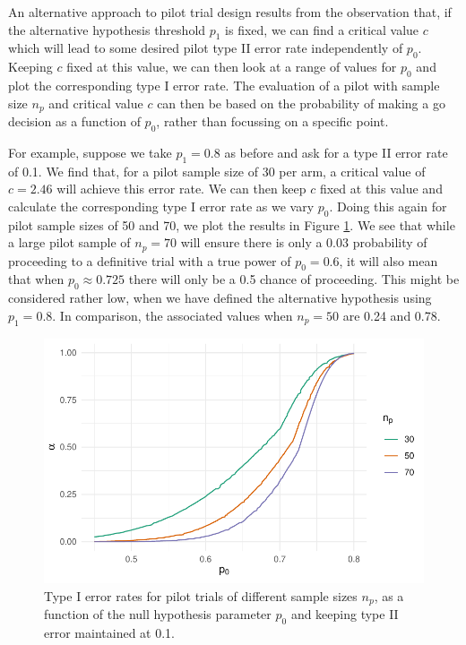 \documentclass[AMA,STIX1COL]{WileyNJD-v2}
\begin{document}
An alternative approach to pilot trial design results from the observation that, if the alternative hypothesis threshold $p_1$ is fixed, we can find a critical value $c$ which will lead to some desired pilot type II error rate independently of $p_0$. Keeping $c$ fixed at this value, we can then look at a range of values for $p_0$ and plot the corresponding type I error rate. The evaluation of a pilot with sample size $n_p$ and critical value $c$ can then be based on the probability of making a go decision as a function of $p_0$, rather than focussing on a specific point.

For example, suppose we take $p_1 = 0.8$ as before and ask for a type II error rate of 0.1. We find that, for a pilot sample size of 30 per arm, a critical value of  $c = 2.46$ will achieve this error rate. We can then keep $c$ fixed at this value and calculate the corresponding type I error rate as we vary $p_0$. Doing this again for pilot sample sizes of 50 and 70, we plot the results in Figure \ref{fig:alt}. We see that while a large pilot sample of $n_p = 70$ will ensure there is only a 0.03 probability of proceeding to a definitive trial with a true power of $p_0 = 0.6$, it will also mean that when $p_0 \approx 0.725$ there will only be a 0.5 chance of proceeding. This might be considered rather low, when we have defined the alternative hypothesis using $p_1 = 0.8$. In comparison, the associated values when $n_p = 50$ are 0.24 and 0.78.

\begin{figure}
\centering
\includegraphics[scale=0.8]{./Figures/alt.pdf}
\caption{Type I error rates for pilot trials of different sample sizes $n_p$, as a function of the null hypothesis parameter $p_0$ and keeping type II error maintained at 0.1.}
\label{fig:alt}
\end{figure}
\end{document}
